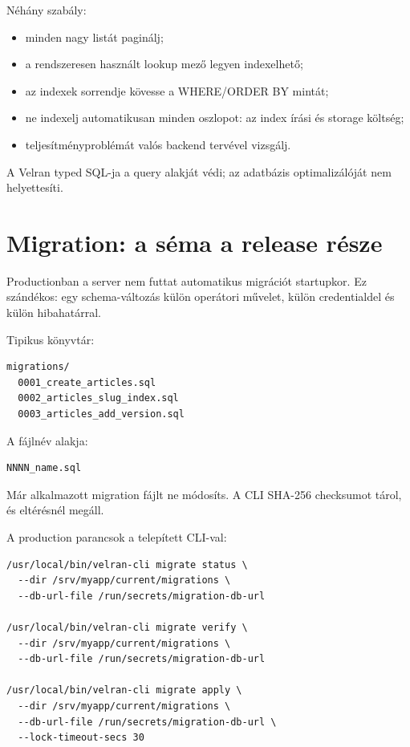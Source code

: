 Néhány szabály:

\begin{itemize}
\item minden nagy listát paginálj;
\item a rendszeresen használt lookup mező legyen indexelhető;
\item az indexek sorrendje kövesse a WHERE/ORDER BY mintát;
\item ne indexelj automatikusan minden oszlopot: az index írási és storage költség;
\item teljesítményproblémát valós backend  tervével vizsgálj.
\end{itemize}

A Velran typed SQL-ja a query alakját védi; az adatbázis optimalizálóját nem helyettesíti.

\section{Migration: a séma a release része}

Productionban a server nem futtat automatikus migrációt startupkor. Ez szándékos: egy schema-változás külön operátori művelet, külön credentialdel és külön hibahatárral.

Tipikus könyvtár:

\begin{lstlisting}
migrations/
  0001_create_articles.sql
  0002_articles_slug_index.sql
  0003_articles_add_version.sql
\end{lstlisting}

A fájlnév alakja:

\begin{lstlisting}
NNNN_name.sql
\end{lstlisting}

Már alkalmazott migration fájlt ne módosíts. A CLI SHA-256 checksumot tárol, és eltérésnél megáll.

A production parancsok a telepített CLI-val:

\begin{lstlisting}
/usr/local/bin/velran-cli migrate status \
  --dir /srv/myapp/current/migrations \
  --db-url-file /run/secrets/migration-db-url

/usr/local/bin/velran-cli migrate verify \
  --dir /srv/myapp/current/migrations \
  --db-url-file /run/secrets/migration-db-url

/usr/local/bin/velran-cli migrate apply \
  --dir /srv/myapp/current/migrations \
  --db-url-file /run/secrets/migration-db-url \
  --lock-timeout-secs 30
\end{lstlisting}

